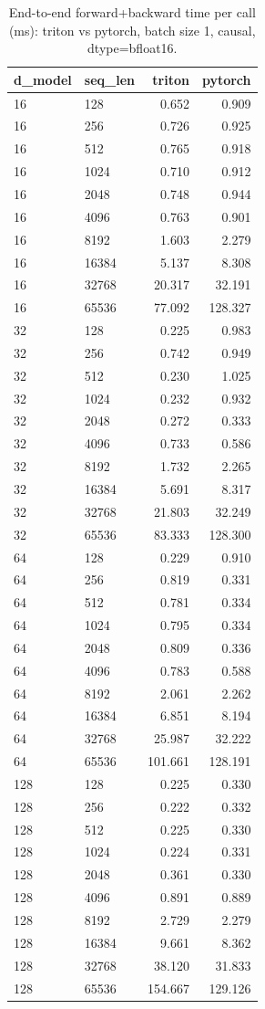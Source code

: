 \begin{table}
\centering
\begin{tabular}{llrr}
\toprule
d\_model & seq\_len & triton & pytorch \\
\midrule
16 & 128 & 0.652 & 0.909 \\
16 & 256 & 0.726 & 0.925 \\
16 & 512 & 0.765 & 0.918 \\
16 & 1024 & 0.710 & 0.912 \\
16 & 2048 & 0.748 & 0.944 \\
16 & 4096 & 0.763 & 0.901 \\
16 & 8192 & 1.603 & 2.279 \\
16 & 16384 & 5.137 & 8.308 \\
16 & 32768 & 20.317 & 32.191 \\
16 & 65536 & 77.092 & 128.327 \\
32 & 128 & 0.225 & 0.983 \\
32 & 256 & 0.742 & 0.949 \\
32 & 512 & 0.230 & 1.025 \\
32 & 1024 & 0.232 & 0.932 \\
32 & 2048 & 0.272 & 0.333 \\
32 & 4096 & 0.733 & 0.586 \\
32 & 8192 & 1.732 & 2.265 \\
32 & 16384 & 5.691 & 8.317 \\
32 & 32768 & 21.803 & 32.249 \\
32 & 65536 & 83.333 & 128.300 \\
64 & 128 & 0.229 & 0.910 \\
64 & 256 & 0.819 & 0.331 \\
64 & 512 & 0.781 & 0.334 \\
64 & 1024 & 0.795 & 0.334 \\
64 & 2048 & 0.809 & 0.336 \\
64 & 4096 & 0.783 & 0.588 \\
64 & 8192 & 2.061 & 2.262 \\
64 & 16384 & 6.851 & 8.194 \\
64 & 32768 & 25.987 & 32.222 \\
64 & 65536 & 101.661 & 128.191 \\
128 & 128 & 0.225 & 0.330 \\
128 & 256 & 0.222 & 0.332 \\
128 & 512 & 0.225 & 0.330 \\
128 & 1024 & 0.224 & 0.331 \\
128 & 2048 & 0.361 & 0.330 \\
128 & 4096 & 0.891 & 0.889 \\
128 & 8192 & 2.729 & 2.279 \\
128 & 16384 & 9.661 & 8.362 \\
128 & 32768 & 38.120 & 31.833 \\
128 & 65536 & 154.667 & 129.126 \\
\bottomrule
\end{tabular}
\caption{End-to-end forward+backward time per call (ms): triton vs pytorch, batch size 1, causal, dtype=bfloat16.}
\label{tab:flash_e2e_compare_bfloat16}
\end{table}
